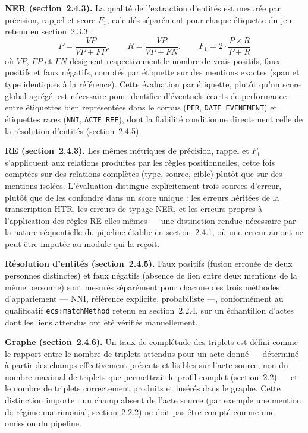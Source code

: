 \textbf{NER (section~2.4.3).} La qualité de l'extraction d'entités est mesurée par précision, rappel et score $F_1$, calculés séparément pour chaque étiquette du jeu retenu en section~2.3.3 :
\begin{equation}
    P = \frac{VP}{VP+FP}, \qquad R = \frac{VP}{VP+FN}, \qquad F_1 = 2\cdot\frac{P\times R}{P+R}
\end{equation}
où $VP$, $FP$ et $FN$ désignent respectivement le nombre de vrais positifs, faux positifs et faux négatifs, comptés par étiquette sur des mentions exactes (span et type identiques à la référence).
Cette évaluation par étiquette, plutôt qu'un score global agrégé, est nécessaire pour identifier d'éventuels écarts de performance entre étiquettes bien représentées dans le corpus (\texttt{PER}, \texttt{DATE\_EVENEMENT}) et étiquettes rares (\texttt{NNI}, \texttt{ACTE\_REF}), dont la fiabilité conditionne directement celle de la résolution d'entités (section~2.4.5).

\textbf{RE (section~2.4.3).} Les mêmes métriques de précision, rappel et $F_1$ s'appliquent aux relations produites par les règles positionnelles, cette fois comptées sur des relations complètes (type, source, cible) plutôt que sur des mentions isolées.
L'évaluation distingue explicitement trois sources d'erreur, plutôt que de les confondre dans un score unique : les erreurs héritées de la transcription HTR, les erreurs de typage NER, et les erreurs propres à l'application des règles RE elles-mêmes --- une distinction rendue nécessaire par la nature séquentielle du pipeline établie en section~2.4.1, où une erreur amont ne peut être imputée au module qui la reçoit.

\textbf{Résolution d'entités (section~2.4.5).} Faux positifs (fusion erronée de deux personnes distinctes) et faux négatifs (absence de lien entre deux mentions de la même personne) sont mesurés séparément pour chacune des trois méthodes d'appariement --- NNI, référence explicite, probabiliste ---, conformément au qualificatif \texttt{ecs:matchMethod} retenu en section~2.2.4, sur un échantillon d'actes dont les liens attendus ont été vérifiés manuellement.

\textbf{Graphe (section~2.4.6).} Un taux de complétude des triplets est défini comme le rapport entre le nombre de triplets attendus pour un acte donné --- déterminé à partir des champs effectivement présents et lisibles sur l'acte source, non du nombre maximal de triplets que permettrait le profil complet (section~2.2) --- et le nombre de triplets correctement produits et insérés dans le graphe.
Cette distinction importe : un champ absent de l'acte source (par exemple une mention de régime matrimonial, section~2.2.2) ne doit pas être compté comme une omission du pipeline.

